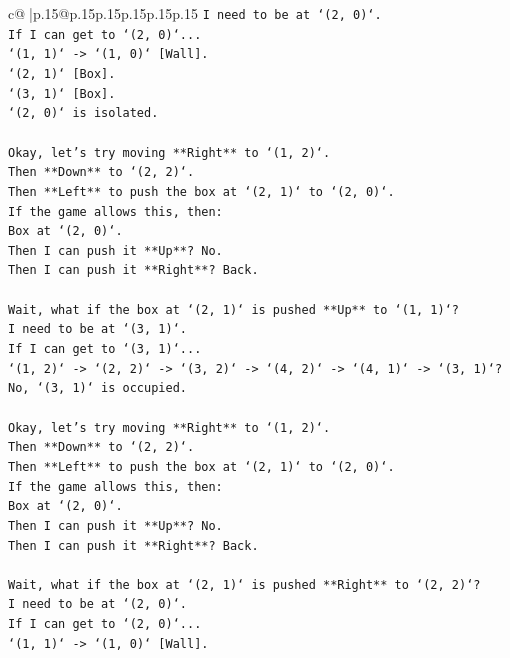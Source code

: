 \documentclass{article}
\begin{document}
{\begin{supertabular}{c@{$\;$}|p{.15\linewidth}@{}p{.15\linewidth}p{.15\linewidth}p{.15\linewidth}p{.15\linewidth}p{.15\linewidth}}
{{{\texttt{I need to be at `(2, 0)`.} \\
\texttt{If I can get to `(2, 0)`...} \\
\texttt{`(1, 1)` {-}> `(1, 0)` {[}Wall{]}.} \\
\texttt{`(2, 1)` {[}Box{]}.} \\
\texttt{`(3, 1)` {[}Box{]}.} \\
\texttt{`(2, 0)` is isolated.} \\
\\ 
\texttt{Okay, let's try moving **Right** to `(1, 2)`.} \\
\texttt{Then **Down** to `(2, 2)`.} \\
\texttt{Then **Left** to push the box at `(2, 1)` to `(2, 0)`.} \\
\texttt{If the game allows this, then:} \\
\texttt{Box at `(2, 0)`.} \\
\texttt{Then I can push it **Up**? No.} \\
\texttt{Then I can push it **Right**? Back.} \\
\\ 
\texttt{Wait, what if the box at `(2, 1)` is pushed **Up** to `(1, 1)`?} \\
\texttt{I need to be at `(3, 1)`.} \\
\texttt{If I can get to `(3, 1)`...} \\
\texttt{`(1, 2)` {-}> `(2, 2)` {-}> `(3, 2)` {-}> `(4, 2)` {-}> `(4, 1)` {-}> `(3, 1)`? No, `(3, 1)` is occupied.} \\
\\ 
\texttt{Okay, let's try moving **Right** to `(1, 2)`.} \\
\texttt{Then **Down** to `(2, 2)`.} \\
\texttt{Then **Left** to push the box at `(2, 1)` to `(2, 0)`.} \\
\texttt{If the game allows this, then:} \\
\texttt{Box at `(2, 0)`.} \\
\texttt{Then I can push it **Up**? No.} \\
\texttt{Then I can push it **Right**? Back.} \\
\\ 
\texttt{Wait, what if the box at `(2, 1)` is pushed **Right** to `(2, 2)`?} \\
\texttt{I need to be at `(2, 0)`.} \\
\texttt{If I can get to `(2, 0)`...} \\
\texttt{`(1, 1)` {-}> `(1, 0)` {[}Wall{]}.} \\
}}}
\end{supertabular}}
\end{document}

